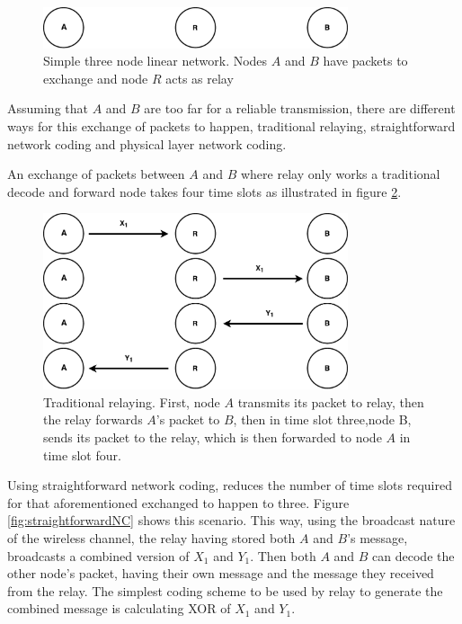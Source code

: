 \begin{figure}
    \centering
    \includegraphics[width=0.8\textwidth]{figures/justThreeNodes.pdf}
    \caption{Simple three node linear network. Nodes $A$ and $B$ have packets to exchange and node $R$ acts as relay} \label{fig:justThreeNodes}
\end{figure}

Assuming that $A$ and $B$ are too far for a reliable transmission, there are different ways for this exchange of packets to happen, traditional relaying, straightforward network coding and physical layer network coding.

An exchange of packets between $A$ and $B$ where relay only works a traditional decode and forward node takes four time slots as illustrated in figure \ref{fig:traditionalRelay}.  

\begin{figure}
    \centering
    \includegraphics[width=0.8\textwidth]{figures/traditionalRelay.pdf}
    \caption{Traditional relaying. First, node $A$ transmits its packet to relay, then the relay forwards $A$'s packet to $B$, then in time slot three,node B, sends its packet to the relay, which is then forwarded to node $A$ in time slot four.} \label{fig:traditionalRelay}
\end{figure}

Using straightforward network coding, reduces the number of time slots required for that aforementioned exchanged to happen to three. Figure \ref{fig:straightforwardNC} shows this scenario. This way, using the broadcast nature of the wireless channel, the relay having stored both $A$ and $B$'s message, broadcasts a combined version of $X_1$ and $Y_1$. Then both $A$ and $B$ can decode the other node's packet, having their own message and the message they received from the relay. The simplest coding scheme to be used by relay to generate the combined message is calculating XOR of  $X_1$ and $Y_1$.

